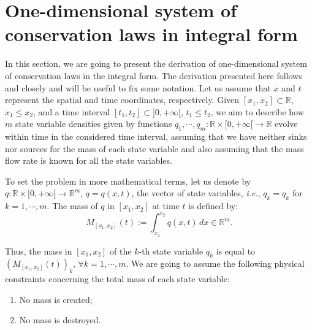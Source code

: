 \section{One-dimensional system of conservation laws in integral form}
\label{chp2-sec1}
In this section, we are going to present the derivation of one-dimensional 
system of conservation laws in the integral form. 
The derivation presented here follows \citet{leveque:1990} and \citet{leveque:2002} closely and will
be useful to fix some notation. 
Let us assume that $x$ and $t$ represent the spatial and time coordinates, respectively.
Given $[x_1, x_2] \subset \mathbb{R}$, $x_1 \leq x_2$, and a time 
interval $[t_1, t_2] \subset ]0, +\infty[$, $t_1 \leq t_2$, 
we aim to describe how $m$ state variable densities given by functions 
$q_1, \cdots, q_m: \mathbb{R}\times[0, +\infty[ \to \mathbb{R}$ 
evolve within time in the considered time interval, assuming that we have neither sinks nor sources 
for the mass of each state variable and also assuming that the mass
flow rate is known for all the state variables.

To set the problem in more mathematical terms, let us denote by 
${q}: \mathbb{R}\times [0, +\infty[\to \mathbb{R}^m$, 
${q} = {q}(x,t)$, the vector of state variables,
\textit{i.e.}, ${q}_k = q_k$ for $k=1, \cdots, m$.
The mass of ${q}$ in $[x_1, x_2]$ at time $t$ is defined by:
\begin{equation}
	\label{chp2-sec1-eq1}
	{M}_{[x_1, x_2]}(t) := \int_{x_1}^{x_2} {q}(x,t) \,dx \in \mathbb{R}^m.
\end{equation}

Thus, the mass in $[x_1, x_2]$ of the $k$-th state variable $q_k$ is equal to
$({M}_{[x_1, x_2]}(t))_k$, $\forall k = 1, \cdots, m$.
We are going to assume the following physical constraints concerning the total mass of each state variable:
\begin{enumerate}
	\item No mass is created;
	\item No mass is destroyed.
\end{enumerate}

